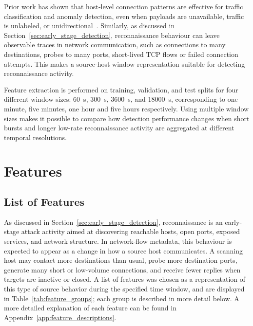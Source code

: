 Prior work has shown that host‑level connection patterns are effective for traffic classification and anomaly detection, even when payloads are unavailable, traffic is unlabeled, or unidirectional~\cite{dewaele_unsupervised_2010}. Similarly, as discussed in Section~\ref{sec:early_stage_detection}, reconnaissance behaviour can leave observable traces in network communication, such as connections to many destinations, probes to many ports, short-lived TCP flows or failed connection attempts. This makes a source-host window representation suitable for detecting reconnaissance activity. 

Feature extraction is performed on training, validation, and test splits for four different window sizes: \SI{60}{s}, \SI{300}{s}, \SI{3600}{s}, and \SI{18000}{s}, corresponding to one minute, five minutes, one hour and five hours respectively. Using multiple window sizes makes it possible to compare how detection performance changes when short bursts and longer low-rate reconnaissance activity are aggregated at different temporal resolutions.

\section{Features}
\label{sec:features}
\subsection{List of Features}
\label{sec:list_of_feat}


As discussed in Section~\ref{sec:early_stage_detection}, reconnaissance is an early-stage attack activity aimed at discovering reachable hosts, open ports, exposed services, and network structure. In network-flow metadata, this behaviour is expected to appear as a change in how a source host communicates. A scanning host may contact more destinations than usual, probe more destination ports, generate many short or low-volume connections, and receive fewer replies when targets are inactive or closed. A list of features was chosen as a representation of this type of source behavior during the specified time window, and are displayed in Table~\ref{tab:feature_groups}; each group is described in more detail below. A more detailed explanation of each feature can be found in Appendix~\ref{app:feature_descriptions}.



